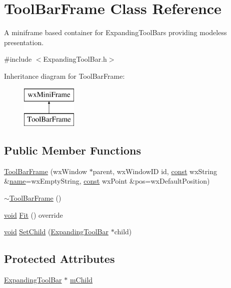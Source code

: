 \hypertarget{class_tool_bar_frame}{}\section{Tool\+Bar\+Frame Class Reference}
\label{class_tool_bar_frame}


A miniframe based container for Expanding\+Tool\+Bars providing modeless presentation.  




{\ttfamily \#include $<$Expanding\+Tool\+Bar.\+h$>$}

Inheritance diagram for Tool\+Bar\+Frame\+:\begin{figure}[H]
\begin{center}
\leavevmode
\includegraphics[height=2.000000cm]{class_tool_bar_frame}
\end{center}
\end{figure}
\subsection*{Public Member Functions}
\begin{DoxyCompactItemize}
\item 
\hyperlink{class_tool_bar_frame_a371d13b6057f19d16916dc9fc176848c}{Tool\+Bar\+Frame} (wx\+Window $\ast$parent, wx\+Window\+ID id, \hyperlink{getopt1_8c_a2c212835823e3c54a8ab6d95c652660e}{const} wx\+String \&\hyperlink{lib_2expat_8h_a1b49b495b59f9e73205b69ad1a2965b0}{name}=wx\+Empty\+String, \hyperlink{getopt1_8c_a2c212835823e3c54a8ab6d95c652660e}{const} wx\+Point \&pos=wx\+Default\+Position)
\item 
\hyperlink{class_tool_bar_frame_a9deb2dab0c1924a3c70dcd45e000e3f3}{$\sim$\+Tool\+Bar\+Frame} ()
\item 
\hyperlink{sound_8c_ae35f5844602719cf66324f4de2a658b3}{void} \hyperlink{class_tool_bar_frame_a820afb382da6c311f55d395b3dab5c9b}{Fit} () override
\item 
\hyperlink{sound_8c_ae35f5844602719cf66324f4de2a658b3}{void} \hyperlink{class_tool_bar_frame_a54990c3df71f798debd139fffec10e37}{Set\+Child} (\hyperlink{class_expanding_tool_bar}{Expanding\+Tool\+Bar} $\ast$child)
\end{DoxyCompactItemize}
\subsection*{Protected Attributes}
\begin{DoxyCompactItemize}
\item 
\hyperlink{class_expanding_tool_bar}{Expanding\+Tool\+Bar} $\ast$ \hyperlink{class_tool_bar_frame_a19a58ad97670e573ca8ff05267907172}{m\+Child}
\end{DoxyCompactItemize}


